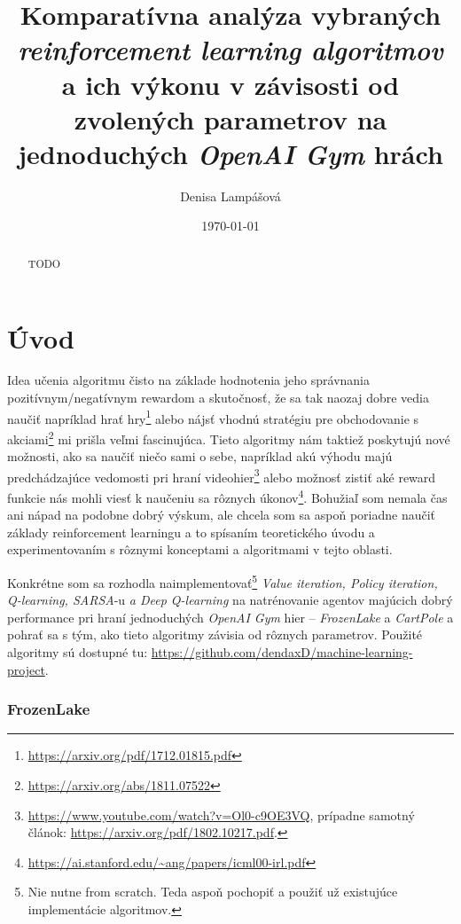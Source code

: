 \documentclass[letterpaper,12pt]{article}
\begin{document}
\title{\large \textbf{Komparatívna analýza vybraných \textit{reinforcement learning algoritmov} a ich výkonu v závisosti od zvolených parametrov \newline na jednoduchých \textit{OpenAI Gym} hrách}}
\author{Denisa Lampášová}
\date{\small \today}
\maketitle

\justify 
\begin{abstract}
TODO
\end{abstract}

\section{Úvod}

\indent\par Idea učenia algoritmu čisto na základe hodnotenia jeho správnania pozitívnym/negatívnym rewardom a skutočnosť, že sa tak naozaj dobre vedia naučiť napríklad hrať hry\footnote{\url{https://arxiv.org/pdf/1712.01815.pdf}} alebo nájsť vhodnú stratégiu pre obchodovanie s akciami\footnote{\url{https://arxiv.org/abs/1811.07522}} mi prišla veľmi fascinujúca. Tieto algoritmy nám taktiež poskytujú nové možnosti, ako sa naučiť niečo sami o sebe, napríklad akú výhodu majú predchádzajúce vedomosti pri hraní videohier\footnote{\url{https://www.youtube.com/watch?v=Ol0-c9OE3VQ}, prípadne samotný článok: \url{https://arxiv.org/pdf/1802.10217.pdf}.} alebo možnosť zistiť aké reward funkcie nás mohli viesť k naučeniu sa rôznych úkonov\footnote{\url{https://ai.stanford.edu/~ang/papers/icml00-irl.pdf}}. Bohužiaľ som nemala čas ani nápad na podobne dobrý výskum, ale chcela som sa aspoň poriadne naučiť základy reinforcement learningu a to spísaním teoretického úvodu a experimentovaním s rôznymi konceptami a algoritmami v tejto oblasti.

Konkrétne som sa rozhodla naimplementovať\footnote{Nie nutne from scratch. Teda aspoň pochopiť a použiť už existujúce implementácie algoritmov.} \textit{Value iteration, Policy iteration, Q-learning, SARSA}-u \textit{a Deep Q-learning} na natrénovanie agentov majúcich dobrý performance pri hraní jednoduchých \textit{OpenAI Gym} hier -- \textit{FrozenLake} a \textit{CartPole} a pohrať sa s tým, ako tieto algoritmy závisia od rôznych parametrov. Použité algoritmy sú dostupné tu: \url{https://github.com/dendaxD/machine-learning-project}.


\subsubsection*{FrozenLake}
\end{document}
